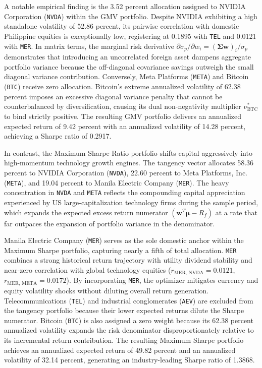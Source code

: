 A notable empirical finding is the 3.52 percent allocation assigned to NVIDIA Corporation (\texttt{NVDA}) within the GMV portfolio. Despite NVIDIA exhibiting a high standalone volatility of 52.86 percent, its pairwise correlation with domestic Philippine equities is exceptionally low, registering at 0.1895 with \texttt{TEL} and 0.0121 with \texttt{MER}. In matrix terms, the marginal risk derivative $\partial \sigma_p / \partial w_i = (\boldsymbol{\Sigma} \mathbf{w})_i / \sigma_p$ demonstrates that introducing an uncorrelated foreign asset dampens aggregate portfolio variance because the off-diagonal covariance savings outweigh the small diagonal variance contribution. Conversely, Meta Platforms (\texttt{META}) and Bitcoin (\texttt{BTC}) receive zero allocation. Bitcoin's extreme annualized volatility of 62.38 percent imposes an excessive diagonal variance penalty that cannot be counterbalanced by diversification, causing its dual non-negativity multiplier $\nu_{\text{BTC}}^*$ to bind strictly positive. The resulting GMV portfolio delivers an annualized expected return of 9.42 percent with an annualized volatility of 14.28 percent, achieving a Sharpe ratio of 0.2917.

In contrast, the Maximum Sharpe Ratio portfolio shifts capital aggressively into high-momentum technology growth engines. The tangency vector allocates 58.36 percent to NVIDIA Corporation (\texttt{NVDA}), 22.60 percent to Meta Platforms, Inc. (\texttt{META}), and 19.04 percent to Manila Electric Company (\texttt{MER}). The heavy concentration in \texttt{NVDA} and \texttt{META} reflects the compounding capital appreciation experienced by US large-capitalization technology firms during the sample period, which expands the expected excess return numerator $(\mathbf{w}^T \boldsymbol{\mu} - R_f)$ at a rate that far outpaces the expansion of portfolio variance in the denominator.

Manila Electric Company (\texttt{MER}) serves as the sole domestic anchor within the Maximum Sharpe portfolio, capturing nearly a fifth of total allocation. \texttt{MER} combines a strong historical return trajectory with utility dividend stability and near-zero correlation with global technology equities ($r_{\text{MER, NVDA}} = 0.0121$, $r_{\text{MER, META}} = 0.0172$). By incorporating \texttt{MER}, the optimizer mitigates currency and equity volatility shocks without diluting overall return generation. Telecommunications (\texttt{TEL}) and industrial conglomerates (\texttt{AEV}) are excluded from the tangency portfolio because their lower expected returns dilute the Sharpe numerator. Bitcoin (\texttt{BTC}) is also assigned a zero weight because its 62.38 percent annualized volatility expands the risk denominator disproportionately relative to its incremental return contribution. The resulting Maximum Sharpe portfolio achieves an annualized expected return of 49.82 percent and an annualized volatility of 32.14 percent, generating an industry-leading Sharpe ratio of 1.3868.

